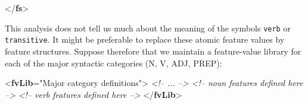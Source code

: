 \begin{shaded}
\hspace*{1em}\hspace*{1em}\hspace*{1em}\mbox{}\newline 
\hspace*{1em}\hspace*{1em}\mbox{}\newline 
\hspace*{1em}\mbox{}\newline 
{}\mbox{}\newline 
{</\textbf{fs}>}\end{shaded}\egroup\par \par
This analysis does not tell us much about the meaning of the symbols \texttt{verb} or \texttt{transitive}. It might be preferable to replace these atomic feature values by feature structures. Suppose therefore that we maintain a feature-value library for each of the major syntactic categories (N, V, ADJ, PREP): \par\bgroup{}\exampleFont \begin{shaded}\noindent\mbox{}{<\textbf{fvLib}\hspace*{1em}{n}="{Major category definitions}">}\mbox{}\newline 
\textit{<!-- ... -->}\mbox{}\newline 
{}\mbox{}\newline 
\textit{<!--  noun features defined here -->}\mbox{}\newline 
{}\mbox{}\newline 
{}\mbox{}\newline 
\textit{<!-- verb features defined here -->}\mbox{}\newline 
{}\mbox{}\newline 
{</\textbf{fvLib}>}\end{shaded}\egroup\par \par
